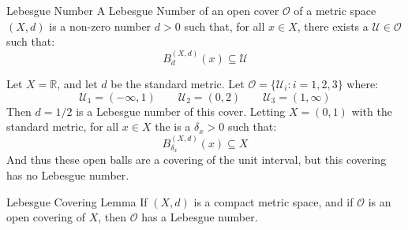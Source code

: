 \documentclass[crop=false,class=article,oneside]{standalone}
\begin{document}
            \begin{ldefinition}{Lebesgue Number}
                A Lebesgue Number of an open cover
                $\mathcal{O}$ of a metric space $(X,d)$ is
                a non-zero number $d>0$ such that, for all
                $x\in{X}$, there exists
                a $\mathcal{U}\in\mathcal{O}$ such that:
                \begin{equation}
                    B_{d}^{(X,d)}(x)\subseteq\mathcal{U}
                \end{equation}
            \end{ldefinition}
            \begin{lexample}
                Let $X=\mathbb{R}$, and let $d$ be the
                standard metric. Let
                $\mathcal{O}=\{\mathcal{U}_{i}:i=1,2,3\}$ where:
                \begin{equation}
                    \mathcal{U}_{1}=(-\infty,1)
                    \quad\quad
                    \mathcal{U}_{2}=(0,2)
                    \quad\quad
                    \mathcal{U}_{3}=(1,\infty)
                \end{equation}
                Then $d=1/2$ is a Lebesgue number of this cover.
                Letting $X=(0,1)$ with the standard metric, for all
                $x\in{X}$ the is a $\delta_{x}>0$ such that:
                \begin{equation}
                    B_{\delta_{x}}^{(X,d)}(x)
                    \subseteq{X}
                \end{equation}
                And thus these open balls are a covering of the unit
                interval, but this covering has no Lebesgue number.
            \end{lexample}
            \begin{ltheorem}{Lebesgue Covering Lemma}
                If $(X,d)$ is a compact metric space, and if
                $\mathcal{O}$ is an open covering of $X$, then
                $\mathcal{O}$ has a Lebesgue number.
            \end{ltheorem}
\end{document}
